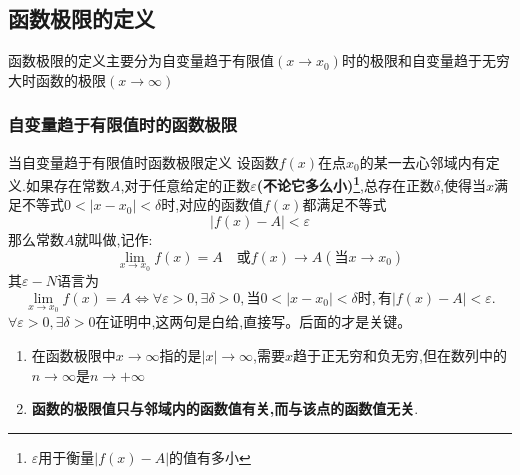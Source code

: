 \documentclass[12pt, a4paper, oneside, UTF8]{ctexbook}
\begin{document}
\begin{sloppypar}
    \subsection{函数极限的定义}
    函数极限的定义主要分为自变量趋于有限值$(x \to x_0)$时的极限和自变量趋于无穷大时函数的极限$(x \to \infty)$
    \subsubsection{自变量趋于有限值时的函数极限}
    \begin{defn}{当自变量趋于有限值时函数极限定义}{}
        设函数$f(x)$在点$x_0$的某一去心邻域内有定义.如果存在常数$A$,对于任意给定的正数$\varepsilon$\textbf{(不论它多么小)\footnote{$\varepsilon$用于衡量$|f(x)-A|$的值有多小}},总存在正数$\delta$,使得当$x$满足不等式$0<|x-x_0|<\delta$时,对应的函数值$f(x)$都满足不等式
        $$
            |f(x)-A|<\varepsilon
        $$
        那么常数$A$就叫做,记作:
        $$
            \lim_{x\to x_0}f(x)=A\quad\text{或}f(x)\to A(\text{当}x\to x_0)
        $$
        其$\varepsilon-N$语言为
        $$
            \lim_{x\to x_0}f(x)=A\Leftrightarrow\forall\varepsilon>0,\exists\delta>0,\text{当}0<|x-x_0|<\delta\text{时},\text{有}|f(x)-A|<\varepsilon.
        $$
        $\forall\varepsilon>0,\exists\delta>0$在证明中,这两句是白给,直接写。后面的才是关键。
    \end{defn}
    \begin{criterion}{}{}
        \begin{enumerate}
            \item 在函数极限中$x \to \infty$指的是$|x| \to \infty$,需要$x$趋于正无穷和负无穷,但在数列中的$n \to \infty$是$n \to +\infty$
            \item \textbf{函数的极限值只与邻域内的函数值有关,而与该点的函数值无关}.
        \end{enumerate}
    \end{criterion}

\end{sloppypar}
\end{document}
